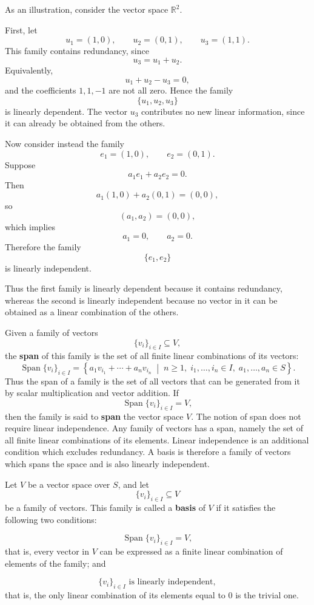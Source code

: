 \documentclass[12pt]{article}
\begin{document}
	As an illustration, consider the vector space \(\mathbb{R}^2\).
	
	First, let
	\[
	u_1=(1,0),\qquad u_2=(0,1),\qquad u_3=(1,1).
	\]
	This family contains redundancy, since
	\[
	u_3=u_1+u_2.
	\]
	Equivalently,
	\[
	u_1+u_2-u_3=0,
	\]
	and the coefficients \(1,1,-1\) are not all zero. Hence the family
	\[
	\{u_1,u_2,u_3\}
	\]
	is linearly dependent. The vector \(u_3\) contributes no new linear information, since it can already be obtained from the others.
	
	Now consider instead the family
	\[
	e_1=(1,0),\qquad e_2=(0,1).
	\]
	Suppose
	\[
	a_1e_1+a_2e_2=0.
	\]
	Then
	\[
	a_1(1,0)+a_2(0,1)=(0,0),
	\]
	so
	\[
	(a_1,a_2)=(0,0),
	\]
	which implies
	\[
	a_1=0,\qquad a_2=0.
	\]
	Therefore the family
	\[
	\{e_1,e_2\}
	\]
	is linearly independent.
	
	Thus the first family is linearly dependent because it contains redundancy, whereas the second is linearly independent because no vector in it can be obtained as a linear combination of the others.
	
	Given a family of vectors
	\[
	\{v_i\}_{i\in I}\subseteq V,
	\]
	the \textbf{span} of this family is the set of all finite linear combinations of its vectors:
	\[
	\operatorname{Span}\{v_i\}_{i\in I}
	=
	\left\{
	a_1v_{i_1}+\cdots+a_nv_{i_n}
	\;\middle|\;
	n\geq 1,\;
	i_1,\dots,i_n\in I,\;
	a_1,\dots,a_n\in S
	\right\}.
	\]
	Thus the span of a family is the set of all vectors that can be generated from it by scalar multiplication and vector addition. If
	\[
	\operatorname{Span}\{v_i\}_{i\in I}=V,
	\]
	then the family is said to \textbf{span} the vector space \(V\). The notion of span does not require linear independence. Any family of vectors has a span, namely the set of all finite linear combinations of its elements. Linear independence is an additional condition which excludes redundancy. A basis is therefore a family of vectors which spans the space and is also linearly independent.
	
	Let \(V\) be a vector space over \(S\), and let
	\[
	\{v_i\}_{i\in I}\subseteq V
	\]
	be a family of vectors. This family is called a \textbf{basis} of \(V\) if it satisfies the following two conditions:
	
	\[
	\operatorname{Span}\{v_i\}_{i\in I}=V,
	\]
	that is, every vector in \(V\) can be expressed as a finite linear combination of elements of the family; and
	
	\[
	\{v_i\}_{i\in I}\text{ is linearly independent},
	\]
	that is, the only linear combination of its elements equal to \(0\) is the trivial one.
	
\end{document}
